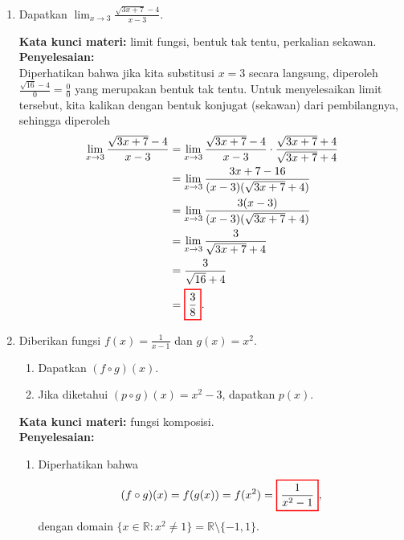 \documentclass[10pt,openany,a4paper]{article}
\theoremstyle{definition}
\theoremstyle{definition}
\theoremstyle{plain}
\newenvironment{jawab}[2][tes]{%
\par\noindent\textbf{Kata kunci materi:} #1.\\
\textbf{Penyelesaian:} #2%
}{}
\begin{document}
\begin{enumerate}
            \item Dapatkan $\displaystyle \lim_{x\to 3} \frac{\sqrt{3x+7}-4}{x-3}$.
            \begin{jawab}[limit fungsi, bentuk tak tentu, perkalian sekawan]{~\\
                Diperhatikan bahwa jika kita substitusi $x=3$ secara langsung, diperoleh $\frac{\sqrt{16}-4}{0}=\frac{0}{0}$ yang merupakan bentuk tak tentu. Untuk menyelesaikan limit tersebut, kita kalikan dengan bentuk konjugat (sekawan) dari pembilangnya, sehingga diperoleh
                \begin{align*}
                    \lim_{x\to 3} \frac{\sqrt{3x+7}-4}{x-3} &= \lim_{x\to 3} \frac{\sqrt{3x+7}-4}{x-3}\cdot\frac{\sqrt{3x+7}+4}{\sqrt{3x+7}+4}\\
                    &= \lim_{x\to 3} \frac{3x+7-16}{(x-3)(\sqrt{3x+7}+4)}\\
                    &= \lim_{x\to 3} \frac{3(x-3)}{(x-3)(\sqrt{3x+7}+4)}\\
                    &= \lim_{x\to 3} \frac{3}{\sqrt{3x+7}+4}\\
                    &= \frac{3}{\sqrt{16}+4}\\
                    &= \colorlet{oldcolor}{.}
        \color{red}
        \setlength{\fboxrule}{1pt} \boxed{\color{oldcolor}\frac{3}{8}}\color{oldcolor}.
                \end{align*}
            }
            \end{jawab}
            \item Diberikan fungsi $f(x)=\frac{1}{x-1}$ dan $g(x)=x^2$.
            \begin{enumerate}
                \item Dapatkan $(f\circ g)(x)$.
                \item Jika diketahui $(p\circ g)(x)=  x^2-3$, dapatkan $p(x)$.
            \end{enumerate}
            \begin{jawab}[fungsi komposisi]{
                \begin{enumerate}
                    \item Diperhatikan bahwa
                    \begin{align*}
                        (f\circ g)(x) = f(g(x)) = f(x^2) = \colorlet{oldcolor}{.}
        \color{red}
        \setlength{\fboxrule}{1pt} \boxed{\color{oldcolor}\frac{1}{x^2-1}}\color{oldcolor},
                    \end{align*}
                    dengan domain $\{x\in\mathbb{R}: x^2\neq 1\}=\mathbb{R}\setminus\{-1,1\}$.

\end{enumerate}}
\end{jawab}
\end{enumerate}
\end{document}
